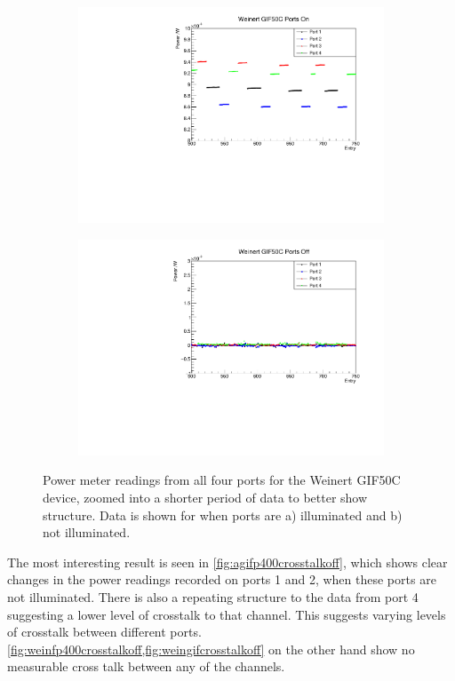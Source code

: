 \documentclass[a4paper,11pt]{article}
\begin{document}
\begin{figure}[h!]
\centering
\begin{subfigure}{0.5\textwidth}
\includegraphics[width=\linewidth]{WeinertGIF50CPortsOnZoom.pdf}
\subcaption{}\label{fig:weingifcrosstalkon}
\end{subfigure}%
\begin{subfigure}{0.5\textwidth}
\includegraphics[width=\linewidth]{WeinertGIF50CPortsOffZoom.pdf}
\subcaption{}\label{fig:weingifcrosstalkoff}
\end{subfigure}
\caption{Power meter readings from all four ports for the Weinert GIF50C device, zoomed into a shorter period of data to better show structure. Data is shown for when ports are a) illuminated and b) not illuminated.}\label{fig:weingifcrosstalk}
\end{figure}
The most interesting result is seen in \cref{fig:agifp400crosstalkoff}, which shows clear changes in the power readings recorded on ports 1 and 2, when these ports are not illuminated. There is also a repeating structure to the data from port 4 suggesting a lower level of crosstalk to that channel. This suggests varying levels of crosstalk between different ports. \cref{fig:weinfp400crosstalkoff,fig:weingifcrosstalkoff} on the other hand show no measurable cross talk between any of the channels.
\end{document}
